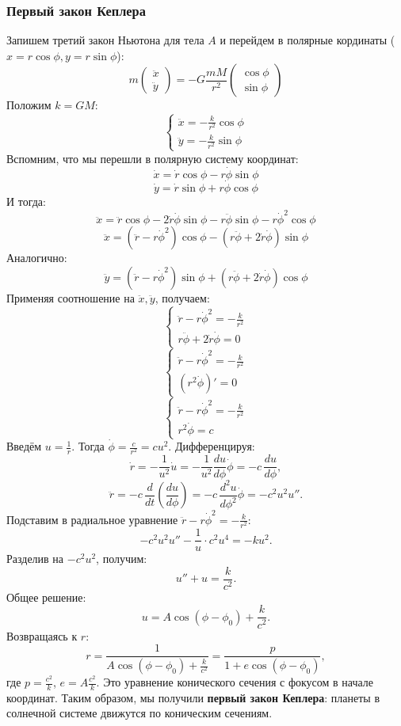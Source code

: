 \subsubsection{Первый закон Кеплера}
Запишем третий закон Ньютона для тела \(A\) и перейдем в полярные кординаты (\(x = r\cos \phi, y = r\sin \phi\)):
\[m\left( \begin{array}{c}
    \ddot{x} \\
    \ddot{y}
\end{array} \right) = -G\frac{mM}{r^2}\left( \begin{array}{c}
    \cos \phi \\
    \sin \phi
\end{array} \right)\]
Положим \(k = GM\):
\[\left\{\begin{array}{l}
    \ddot{x} = -\frac{k}{r^2}\cos \phi \\
    \ddot{y} = -\frac{k}{r^2}\sin \phi
\end{array}\right.\]
Вспомним, что мы перешли в полярную систему координат:
\[\dot{x} = \dot{r}\cos \phi - r \dot{\phi} \sin\phi\]
\[\dot{y} = \dot{r}\sin \phi + r \dot{\phi} \cos\phi\]
И тогда:
\[\ddot{x} = \ddot{r}\cos \phi - 2\dot{r}\dot{\phi} \sin\phi - r\ddot{\phi}\sin\phi - r\dot{\phi}^2\cos \phi\]
\[\ddot{x} = (\ddot{r} - r\dot{\phi}^2)\cos \phi - (r\ddot{\phi} + 2\dot{r}\dot{\phi})\sin\phi\]
Аналогично:
\[\ddot{y} = (\ddot{r} - r\dot{\phi}^2)\sin \phi + (r\ddot{\phi} + 2\dot{r}\dot{\phi})\cos\phi\]
Применяя соотношение на \(\ddot{x}, \ddot{y}\), получаем:
\[\left\{\begin{array}{l}
    \ddot{r} - r\dot{\phi}^2 = -\frac{k}{r^2} \\
    r\ddot{\phi} + 2\dot{r}\dot{\phi} = 0
\end{array}\right.\]
\[\left\{\begin{array}{l}
    \ddot{r} - r\dot{\phi}^2 = -\frac{k}{r^2} \\
    (r^2\dot{\phi})' = 0
\end{array}\right.\]
\[\left\{\begin{array}{l}
    \ddot{r} - r\dot{\phi}^2 = -\frac{k}{r^2} \\
    r^2\dot{\phi} = c
\end{array}\right.\]
Введём \(u = \frac{1}{r}\). Тогда \(\dot{\phi} = \frac{c}{r^2} = c u^2\). Дифференцируя:
\[
\dot{r} = -\frac{1}{u^2}\dot{u} = -\frac{1}{u^2}\frac{du}{d\phi}\dot{\phi} = -c\,\frac{du}{d\phi},
\]
\[
\ddot{r} = -c\,\frac{d}{dt}\left(\frac{du}{d\phi}\right) = -c\,\frac{d^2u}{d\phi^2}\dot{\phi} = -c^2 u^2 u''.
\]
Подставим в радиальное уравнение \(\ddot{r} - r\dot{\phi}^2 = -\frac{k}{r^2}\):
\[
-c^2 u^2 u'' - \frac1u \cdot c^2 u^4 = -k u^2.
\]
Разделив на \(-c^2 u^2\), получим:
\[
u'' + u = \frac{k}{c^2}.
\]
Общее решение:
\[
u = A\cos(\phi - \phi_0) + \frac{k}{c^2}.
\]
Возвращаясь к \(r\):
\[
r = \frac{1}{A\cos(\phi - \phi_0) + \frac{k}{c^2}} = \frac{p}{1 + e\cos(\phi - \phi_0)},
\]
где \(p = \frac{c^2}{k}\), \(e = A\frac{c^2}{k}\). Это уравнение конического сечения с фокусом в начале координат. Таким образом, мы получили \textbf{первый закон Кеплера}: планеты в солнечной системе движутся по коническим сечениям.

